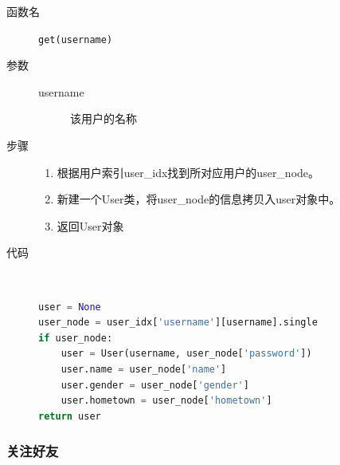 \documentclass{yaldc}
\begin{document}
\begin{description}
    \item[函数名] \verb|get(username)|
    \item[参数]
        \begin{description}
            \item[username] 该用户的名称
        \end{description}
    \item[步骤]
        \begin{enumerate}
            \item 根据用户索引user\_idx找到所对应用户的user\_node。
            \item 新建一个User类，将user\_node的信息拷贝入user对象中。
            \item 返回User对象
        \end{enumerate}
    \item[代码] ~
        \begin{lstlisting}[language=Python]
user = None
user_node = user_idx['username'][username].single
if user_node:
    user = User(username, user_node['password'])
    user.name = user_node['name']
    user.gender = user_node['gender']
    user.hometown = user_node['hometown']
return user
        \end{lstlisting}
\end{description}

\subsubsection{关注好友}
\end{document}

